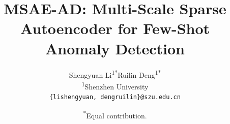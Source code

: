 \documentclass[10pt,twocolumn,letterpaper]{article}
\title{MSAE-AD: Multi-Scale Sparse Autoencoder for Few-Shot Anomaly Detection}
\author{Shengyuan Li\textsuperscript{1*}\qquad Ruilin Deng\textsuperscript{1*}\\
\textsuperscript{1}Shenzhen University\\
{\tt\small \{lishengyuan, dengruilin\}@szu.edu.cn}
\and
\textsuperscript{*}Equal contribution.}
\begin{document}
\maketitle







{
    \small
    
    
}
\end{document}
